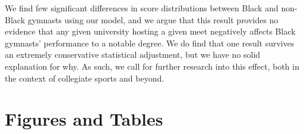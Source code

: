 \documentclass[12pt]{article}
\begin{document}
We find few significant differences in score distributions between Black and non-Black gymnasts using our model, and we argue that this result provides no evidence that any given university hosting a given meet negatively affects Black gymnasts’ performance to a notable degree. We do find that one result survives an extremely conservative statistical adjustment, but we have no solid explanation for why. As such, we call for further research into this effect, both in the context of collegiate sports and beyond.


\newpage
 




\newpage
\section*{Figures and Tables} 
\end{document}
